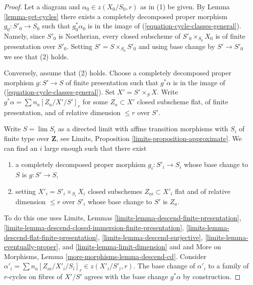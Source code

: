 \documentclass{stacks-project}
\theoremstyle{plain}
\theoremstyle{definition}
\theoremstyle{remark}
\numberwithin{equation}{subsection}
\def\lim{\mathop{\mathrm{lim}}\nolimits}
\begin{document}
\begin{proof}
Let a diagram and $\alpha_0 \in z(X_0/S_0, r)$ as in (1) be given.
By Lemma \ref{lemma-get-cycles} there exists a completely decomposed proper
morphism $g_0 : S'_0 \to S_0$ such that $g_0^*\alpha_0$ is in
the image of (\ref{equation-cycle-classes-general}). Namely, since
$S'_0$ is Noetherian, every closed subscheme of $S'_0 \times_{S_0} X_0$
is of finite presentation over $S'_0$. Setting $S' = S \times_{S_0} S'_0$
and using base change by $S' \to S'_0$ we see that (2) holds.

\medskip\noindent
Conversely, assume that (2) holds. Choose a completely decomposed proper
morphism $g : S' \to S$ of finite presentation such that $g^*\alpha$ is in the
image of (\ref{equation-cycle-classes-general}). Set $X' = S' \times_S X$.
Write $g^*\alpha = \sum n_a [Z_a/X'/S']_r$ for some $Z_a \subset X'$
closed subscheme flat, of finite presentation, and of relative dimension
$\leq r$ over $S'$.

\medskip\noindent
Write $S = \lim S_i$ as a directed limit with affine transition
morphisms with $S_i$ of finite type over $\mathbf{Z}$,
see Limits, Proposition \ref{limits-proposition-approximate}.
We can find an $i$ large enough such that there exist
\begin{enumerate}
\item a completely decomposed proper morphism $g_i : S'_i \to S_i$
whose base change to $S$ is $g : S' \to S$,
\item setting $X'_i = S'_i \times_{S_i} X_i$
closed subschemes $Z_{ai} \subset X'_i$ flat and of
relative dimension $\leq r$ over $S'_i$ whose base change to $S'$
is $Z_a$.
\end{enumerate}
To do this one uses Limits, Lemmas
\ref{limits-lemma-descend-finite-presentation},
\ref{limits-lemma-descend-closed-immersion-finite-presentation},
\ref{limits-lemma-descend-flat-finite-presentation},
\ref{limits-lemma-descend-surjective},
\ref{limits-lemma-eventually-proper}, and
\ref{limits-lemma-limit-dimension}
and
and More on Morphisms, Lemma
\ref{more-morphisms-lemma-descend-cd}.
Consider $\alpha'_i = \sum n_a [Z_{ai}/X'_i/S_i]_r \in z(X'_i/S'_i, r)$.
The base change of $\alpha'_i$ to a family of $r$-cycles on fibres
of $X'/S'$ agrees with the base change $g^*\alpha$ by construction.


\end{proof}
\end{document}
